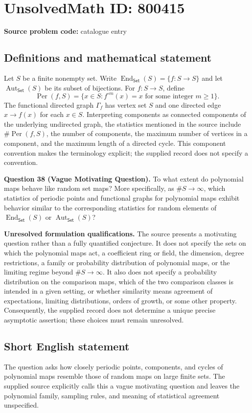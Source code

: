 \documentclass[11pt]{article}
\begin{document}
\section*{UnsolvedMath ID: 800415}
\textbf{Source problem code:} catalogue entry
\subsection{Definitions and mathematical statement}
Let \(S\) be a finite nonempty set. Write \(\operatorname{End}_{\mathsf{Set}}(S)=\{f:S\to S\}\) and let \(\operatorname{Aut}_{\mathsf{Set}}(S)\) be its subset of bijections. For \(f:S\to S\), define
\[
\operatorname{Per}(f,S)=\{x\in S: f^{\circ m}(x)=x\text{ for some integer }m\geq 1\}.
\]
The functional directed graph \(\Gamma_f\) has vertex set \(S\) and one directed edge \(x\to f(x)\) for each \(x\in S\). Interpreting components as connected components of the underlying undirected graph, the statistics mentioned in the source include \(\#\operatorname{Per}(f,S)\), the number of components, the maximum number of vertices in a component, and the maximum length of a directed cycle. This component convention makes the terminology explicit; the supplied record does not specify a convention.

\textbf{Question 38 (Vague Motivating Question).} To what extent do polynomial maps behave like random set maps? More specifically, as \(\#S\to\infty\), which statistics of periodic points and functional graphs for polynomial maps exhibit behavior similar to the corresponding statistics for random elements of \(\operatorname{End}_{\mathsf{Set}}(S)\) or \(\operatorname{Aut}_{\mathsf{Set}}(S)\)?

\textbf{Unresolved formulation qualifications.} The source presents a motivating question rather than a fully quantified conjecture. It does not specify the sets on which the polynomial maps act, a coefficient ring or field, the dimension, degree restrictions, a family or probability distribution of polynomial maps, or the limiting regime beyond \(\#S\to\infty\). It also does not specify a probability distribution on the comparison maps, which of the two comparison classes is intended in a given setting, or whether similarity means agreement of expectations, limiting distributions, orders of growth, or some other property. Consequently, the supplied record does not determine a unique precise asymptotic assertion; these choices must remain unresolved.
\subsection{Short English statement}
The question asks how closely periodic points, components, and cycles of polynomial maps resemble those of random maps on large finite sets. The supplied source explicitly calls this a vague motivating question and leaves the polynomial family, sampling rules, and meaning of statistical agreement unspecified.
\end{document}
